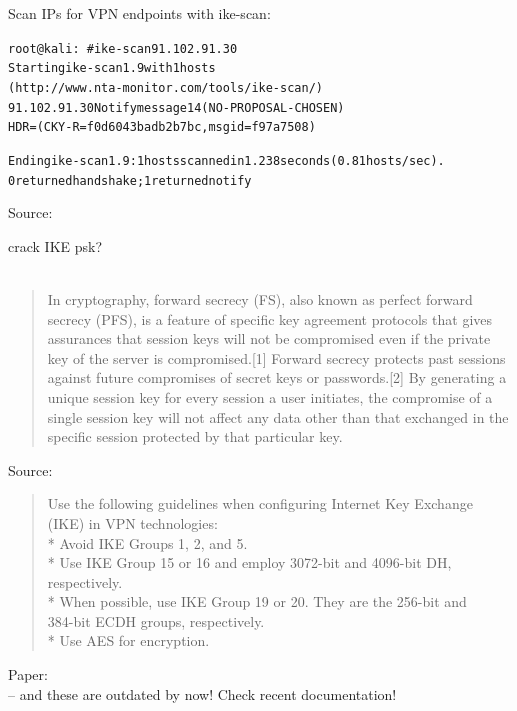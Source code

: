 \documentclass[Screen16to9,17pt]{foils}
\begin{document}
Scan IPs for VPN endpoints with ike-scan:
\begin{alltt}\small
root@kali:~# ike-scan 91.102.91.30
Starting ike-scan 1.9 with 1 hosts
(http://www.nta-monitor.com/tools/ike-scan/)
91.102.91.30	Notify message 14 (NO-PROPOSAL-CHOSEN)
HDR=(CKY-R=f0d6043badb2b7bc, msgid=f97a7508)

Ending ike-scan 1.9: 1 hosts scanned in 1.238 seconds (0.81 hosts/sec).
0 returned handshake; 1 returned notify
\end{alltt}

Source:\\
{\small{}}

crack IKE psk?\\
{\small
{} \\
}



\begin{quote}
In cryptography, forward secrecy (FS), also known as perfect forward secrecy (PFS), is a feature of specific key agreement protocols that gives assurances that session keys will not be compromised even if the private key of the server is compromised.[1] Forward secrecy protects past sessions against future compromises of secret keys or passwords.[2] By generating a unique session key for every session a user initiates, the compromise of a single session key will not affect any data other than that exchanged in the specific session protected by that particular key.
\end{quote}

Source: 




\begin{quote}\footnotesize
  Use the following guidelines when configuring Internet Key Exchange (IKE) in VPN technologies:\\
* Avoid IKE Groups 1, 2, and 5.\\
* Use IKE Group 15 or 16 and employ 3072-bit and 4096-bit DH, respectively.\\
* When possible, use IKE Group 19 or 20. They are the 256-bit and \\
384-bit ECDH groups, respectively.\\
* Use AES for encryption.
\end{quote}
Paper:
{\small {}}\\
-- and these are outdated by now! Check recent documentation!
\end{document}
